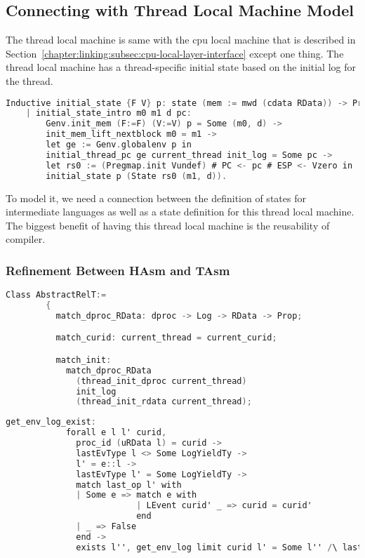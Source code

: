 
\subsection{Connecting with Thread Local Machine Model}
\label{chapter:linking:subsec:connecting-with-thread-local-machine-model}

The thread local machine is same with 
the cpu local machine that is described in Section~\ref{chapter:linking:subsec:cpu-local-layer-interface}
except one thing. 
The thread local machine has a thread-specific initial state 
based on the initial log for the thread. 
\begin{lstlisting}[language=C]
  Inductive initial_state {F V} p: state (mem := mwd (cdata RData)) -> Prop :=
    | initial_state_intro m0 m1 d pc:
        Genv.init_mem (F:=F) (V:=V) p = Some (m0, d) ->
        init_mem_lift_nextblock m0 = m1 ->
        let ge := Genv.globalenv p in
        initial_thread_pc ge current_thread init_log = Some pc ->
        let rs0 := (Pregmap.init Vundef) # PC <- pc # ESP <- Vzero in
        initial_state p (State rs0 (m1, d)).
\end{lstlisting}
To model it, 
we need a connection between the definition of states for intermediate languages 
as well as a state definition for this thread local machine. 
The biggest benefit of having this thread local machine is 
the reusability of compiler. 


\subsubsection{Refinement Between HAsm and TAsm}

\begin{lstlisting}[language=C]
      Class AbstractRelT:=
        {
          match_dproc_RData: dproc -> Log -> RData -> Prop;

          match_curid: current_thread = current_curid;

          match_init:
            match_dproc_RData
              (thread_init_dproc current_thread)
              init_log
              (thread_init_rdata current_thread);
\end{lstlisting}

\begin{lstlisting}[language=C]
          get_env_log_exist: 
            forall e l l' curid, 
              proc_id (uRData l) = curid ->
              lastEvType l <> Some LogYieldTy ->
              l' = e::l ->
              lastEvType l' = Some LogYieldTy ->
              match last_op l' with
              | Some e => match e with 
                          | LEvent curid' _ => curid = curid'
                          end
              | _ => False
              end ->
              exists l'', get_env_log limit curid l' = Some l'' /\ lastEvType l'' = Some LogYieldTy;
\end{lstlisting}

